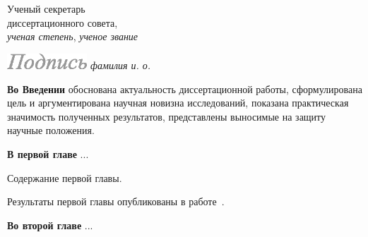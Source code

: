 \documentclass[%
autoref,     %
href,        %
colorlinks,  %
facsimile,   %
]{disser}
\begin{document}
\vfill\noindent
\begin{minipage}[b]{0.4\linewidth}
  Ученый секретарь\\
  диссертационного совета,\\
  \emph{ученая степень}, \emph{ученое звание}
\end{minipage}
\hfill
\makeatletter
\ifDis@facsimile
  \includegraphics[width=3cm]{sec-facsimile}\hfill
\fi%
\makeatother%
\emph{фамилия и. о.}

\clearpage


\actualitysection
\actualitytext

\developmentsection
\developmenttext

\objectivesection
\objectivetext

\noveltysection
\noveltytext

{}

\methodssection
\methodstext

\resultssection
\resultstext

\approbationsection
\approbationtext

\pubsection
\pubtext

\contribsection
\contribtext

\structsection
\structtext


\textbf{Во Введении} обоснована актуальность диссертационной работы, сформулирована цель и аргументирована научная новизна исследований, показана практическая значимость полученных результатов, представлены выносимые на защиту научные положения.

\textbf{В первой главе} ...

Содержание первой главы.

Результаты первой главы опубликованы в работе~\cite{Ivanov_1999_Journal_17_173}.

\textbf{Во второй главе} ...
\end{document}
